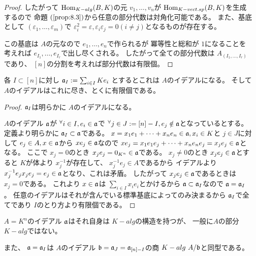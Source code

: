 \documentclass[../master_galois_theory]{subfiles}
\begin{document}
\begin{proof}
  したがって $\mathrm{Hom}_{K-alg}(B,K)$の元 $v_1 , \dots , v_n$が
  $\mathrm{Hom}_{K-vect.sp}(B,K)$を生成するので
  命題 $(\mathrm{\ref{prop:8.3}})$から任意の部分代数は対角化可能である。
  また、基底として $(\varepsilon_1 , \dots , \varepsilon_m)$で
  $\varepsilon_i^2 = \varepsilon , \varepsilon_i \varepsilon_j = 0 (i \neq j)$となるものが存在する。

  この基底は $A$の元なので $e_1 , \dots , e_n$で作られるが
  冪等性と総和が $1$になることを考えれば $e_{I_1} , \dots , e_{I_r}$で出し尽くされる。
  したがって全ての部分代数は $A_{(I_1 , \dots , I_r)}$であり、
  $[n]$の分割を考えれば部分代数は有限個。
\end{proof}

\begin{prop} \label{prop:ideal}
  各 $I \subset [n]$に対し
  $\mathfrak{a}_I := \sum_{i \in I}K e_i$
  とするとこれは $A$のイデアルになる。
  そして $A$のイデアルはこれに尽き、とくに有限個である。
\end{prop}

\begin{proof}
  $\mathfrak{a}_I$は明らかに $A$のイデアルになる。

  $A$のイデアル $\mathfrak{a}$が ${}^\forall i \in I , e_i \in \mathfrak{a}$で
  ${}^\forall j \in J := [n] - I , e_j \notin \mathfrak{a}$となっているとする。
  定義より明らかに $\mathfrak{a}_I \subset \mathfrak{a}$である。
  $x = x_1 e_1 + \cdots + x_n e_n \in \mathfrak{a} , x_i \in K$と
  $j \in J$に対して
  $e_j \in A , x \in \mathfrak{a}$から $x e_j \in \mathfrak{a}$なので
  $x e_j = x_1 e_1 e_j + \cdots + x_n e_n e_j = x_j e_j \in \mathfrak{a}$となる。
  ここで $x_j = 0$のとき $x_j e_j = 0_{K^n} \in \mathfrak{a}$である。
  $x_j \neq 0$のとき $x_j e_j \in \mathfrak{a}$とすると
  $K$が体より $x_j^{-1}$が存在して、 $x_j^{-1} e_j \in A$であるから
  イデアルより $x_j^{-1} e_j x_j e_j = e_j \in \mathfrak{a}$となり、これは矛盾。
  したがって $x_j e_j \in \mathfrak{a}$であるときは $x_j = 0$である。
  これより $x \in \mathfrak{a}$は $\sum_{i \in I} x_i e_i$とかけるから
  $\mathfrak{a} \subset \mathfrak{a}_I$なので $\mathfrak{a} = \mathfrak{a}_I$。
  任意のイデアルはそれが含んでいる標準基底によってのみ決まるから
  $\mathfrak{a}_I$で全てであり $I$のとり方より有限個である。
\end{proof}

\begin{rem}
  $A = K^n$のイデアル $\mathfrak{a}$はそれ自身は $K-alg$の構造を持つが、
  一般に$A$の部分 $K-alg$ではない。

  また、 $\mathfrak{a} = \mathfrak{a}_I$は $A$のイデアル $\mathfrak{b} = \mathfrak{a}_J = \mathfrak{a}_{[n] - I}$の商 $K-alg \  A/\mathfrak{b}$と同型である。
\end{rem}
\end{document}
